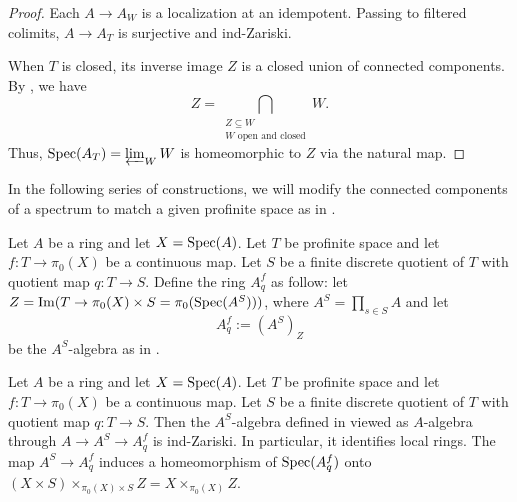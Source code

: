 \begin{proof}
  \leanok
  Each $A \to A_W$ is a localization at an idempotent. Passing to filtered colimits, $A \to A_T$ is surjective and ind-Zariski.

  When $T$ is closed, its inverse image $Z$ is a closed union of connected components. By , we have
  \[
    Z = \bigcap_{\substack{Z \subseteq W \\ W \text{ open and closed}}} W.
  \]
  Thus, $\operatorname{Spec}(A_T) = \varprojlim_W W$ is homeomorphic to $Z$ via the natural map.
\end{proof}

In the following series of constructions, we will modify the connected components of a spectrum to match a given profinite space as in {\cite[\href{https://stacks.math.columbia.edu/tag/097D}{Tag 097D}]{stacks-project}}.

\begin{definition}
  \label{def:modify-pi0-finite}
  \leanok
  Let $A$ be a ring and let $X = \operatorname{Spec} (A)$. Let $T$ be profinite space and let 
  $f : T \to \pi_0(X)$ be a continuous map. Let \(S\) be a finite discrete quotient of 
  \(T\) with quotient map \(q : T \to S\).  Define the ring $A^f_{q}$ as follow: 
  let $Z = \operatorname{Im} (T \to \pi_0(X) \times S = \pi_0(\operatorname{Spec} (A^{S})))$, 
  where \(A^{S} = \prod_{s \in S} A\) and let 
  \[A^f_{q} := (A^{S})_{Z}\] 
  be the $A^S$-algebra as in .
\end{definition}

\begin{lemma}
  \label{thm:modify-pi0-finite-properties}
  \leanok
  Let $A$ be a ring and let $X = \operatorname{Spec} (A)$. Let $T$ be profinite space and let $f : T \to \pi_0(X)$ be a continuous map. Let \(S\) be a finite discrete quotient of \(T\) with quotient map \(q : T \to S\). Then the $A^S$-algebra defined in  viewed as $A$-algebra through $A \to A^S \to A^f_{q}$ is ind-Zariski. In particular, it identifies local rings. The map $A^S \to A^f_{q}$ induces a homeomorphism of $\operatorname{Spec} (A^f_{q})$ onto \((X \times S) \times_{\pi_0(X) \times S} Z = X \times_{\pi_0(X)} Z\).
\end{lemma}

